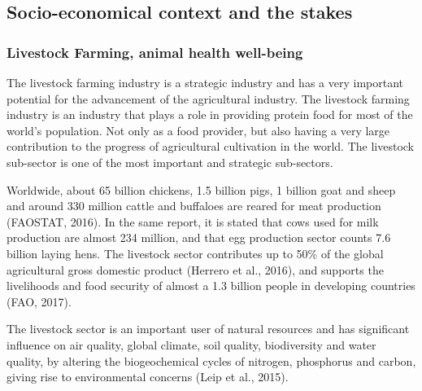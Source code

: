 \subsection{Socio-economical context and the stakes}




\subsubsection{Livestock Farming, animal health well-being}

The livestock farming industry is a strategic industry and has a very important
potential for the advancement of the agricultural industry. The livestock farming
industry is an industry that plays a role in providing protein food for most of the world’s population. Not only as a food provider, but also having a very large contribution to the progress of agricultural cultivation in the world. The livestock sub-sector is one of the most important and strategic sub-sectors.

Worldwide, about 65 billion chickens, 1.5 billion pigs, 1 billion
goat and sheep and around 330 million cattle and buffaloes are reared
for meat production (FAOSTAT, 2016). In the same report, it is stated
that cows used for milk production are almost 234 million, and that
egg production sector counts 7.6 billion laying hens. The livestock sector
contributes up to 50\% of the global agricultural gross domestic product
(Herrero et al., 2016), and supports the livelihoods and food security
of almost a 1.3 billion people in developing countries (FAO, 2017).

The livestock sector is an important user of natural resources and has significant influence on air quality, global climate, soil quality, biodiversity and water quality, by altering the biogeochemical cycles of nitrogen, phosphorus and carbon, giving rise to environmental concerns (Leip et al., 2015).

